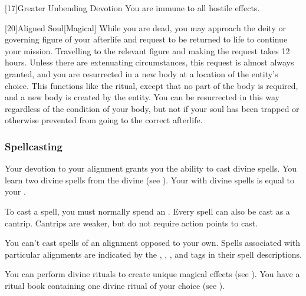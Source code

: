             [17]{Greater Unbending Devotion}
            You are immune to all hostile  effects.

            [20]{Aligned Soul}[Magical]
            While you are dead, you may approach the deity or governing figure of your afterlife and request to be returned to life to continue your mission.
            Travelling to the relevant figure and making the request takes 12 hours.
            Unless there are extenuating circumstances, this request is almost always granted, and you are resurrected in a new body at a location of the entity's choice.
            This functions like the  ritual, except that no part of the body is required, and a new body is created by the entity.
            You can be resurrected in this way regardless of the condition of your body, but not if your soul has been trapped or otherwise prevented from going to the correct afterlife.

        \subsubsection{Spellcasting}

            Your devotion to your alignment grants you the ability to cast divine spells.
            You learn two divine spells from the divine  (see ).
            Your  with divine spells is equal to your .

            To cast a spell, you must normally spend an .
            Every spell can also be cast as a cantrip.
            Cantrips are weaker, but do not require action points to cast.

            You can't cast spells of an alignment opposed to your own.
            Spells associated with particular alignments are indicated by the , , , and  tags in their spell descriptions.

            You can perform divine rituals to create unique magical effects (see ).
            You have a ritual book containing one divine ritual of your choice (see ).

